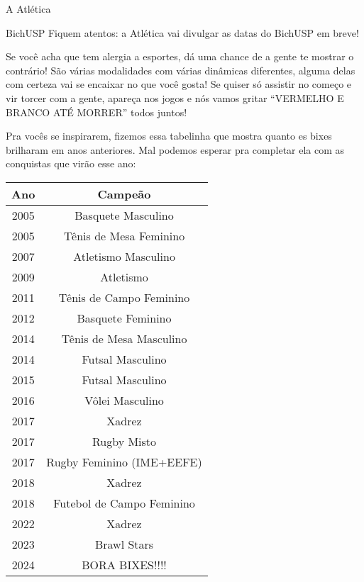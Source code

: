 \begin{secao}{A Atlética}
\begin{subsecao}{BichUSP}
Fiquem atentos: a Atlética vai divulgar as datas do BichUSP em breve!

Se você acha que tem alergia a esportes, dá uma chance de a gente te mostrar
o contrário! São várias modalidades com várias dinâmicas diferentes, alguma
delas com certeza vai se encaixar no que você gosta! Se quiser só assistir
no começo e vir torcer com a gente, apareça nos jogos e nós vamos gritar
``VERMELHO E BRANCO ATÉ MORRER'' todos juntos!



Pra vocês se inspirarem, fizemos essa tabelinha que mostra quanto es bixes
brilharam em anos anteriores. Mal podemos esperar pra completar ela com as
conquistas que virão esse ano:

\begin{center}
  \begin{tabular}{|c|c|}
    \hline
    Ano & Campeão\\
    \hline
    2005 & Basquete Masculino \\
    2005 & Tênis de Mesa Feminino \\
    2007 & Atletismo Masculino\\
    2009 & Atletismo\\
    2011 & Tênis de Campo Feminino\\
    2012 & Basquete Feminino\\
    2014 & Tênis de Mesa Masculino\\
    2014 & Futsal Masculino\\
    2015 & Futsal Masculino\\
    2016 & Vôlei Masculino\\
    2017 & Xadrez\\
    2017 & Rugby Misto\\
    2017 & Rugby Feminino (IME+EEFE)\\
    2018 & Xadrez\\
    2018 & Futebol de Campo Feminino\\
    2022 & Xadrez\\
    2023 & Brawl Stars\\
    2024 & BORA BIXES!!!!\\
    \hline
  \end{tabular}
\end{center}


\end{subsecao}
\end{secao}
